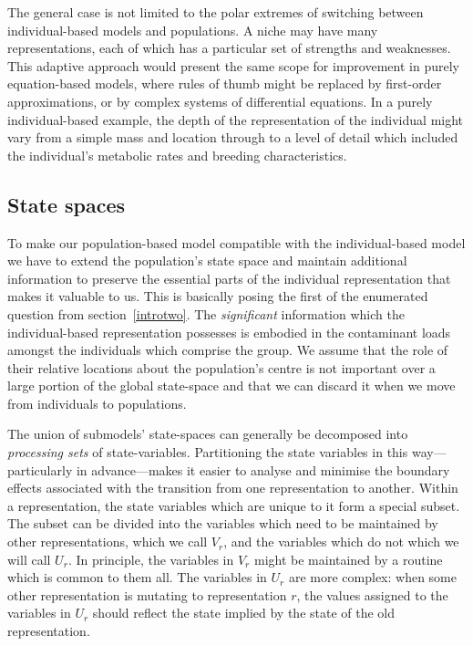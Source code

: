 The general case is not limited to the polar extremes of switching between
individual-based models and populations. A niche may have many
representations, each of which has a particular set of strengths and
weaknesses. This adaptive approach would present the same scope for
improvement in purely equation-based models, where rules of thumb might be
replaced by first-order approximations, or by complex systems of differential
equations. In a purely individual-based example, the depth of the
representation of the individual might vary from a simple mass and location
through to a level of detail which included the individual's metabolic rates
and breeding characteristics.

\subsection{State spaces}

To make our population-based model compatible with the individual-based model
we have to extend the population's state space and maintain additional
information to preserve the essential parts of the individual representation
that makes it valuable to us. This is basically posing the first of the
enumerated question from section~\ref{introtwo}. The {\em{significant}\/}
information which the individual-based representation possesses is embodied in
the contaminant loads amongst the individuals which comprise the group. We
assume that the role of their relative locations about the population's centre
is not important over a large portion of the global state-space and that we
can discard it when we move from individuals to populations.

The union of submodels' state-spaces can generally be decomposed into
{\em{processing sets}\/} of state-variables. Partitioning the state variables
in this way---particularly in advance---makes it easier to analyse and
minimise the boundary effects associated with the transition from one
representation to another. Within a representation, the state variables which
are unique to it form a special subset. The subset can be divided into the
variables which need to be maintained by other representations, which we call
$V_r^{}$, and the variables which do not which we will call $U_r^{}$. In
principle, the variables in $V_r$ might be maintained by a routine which is
common to them all. The variables in $U_r$ are more complex: when some other
representation is mutating to representation $r$, the values assigned to the
variables in $U_r$ should reflect the state implied by the state of the old
representation.


